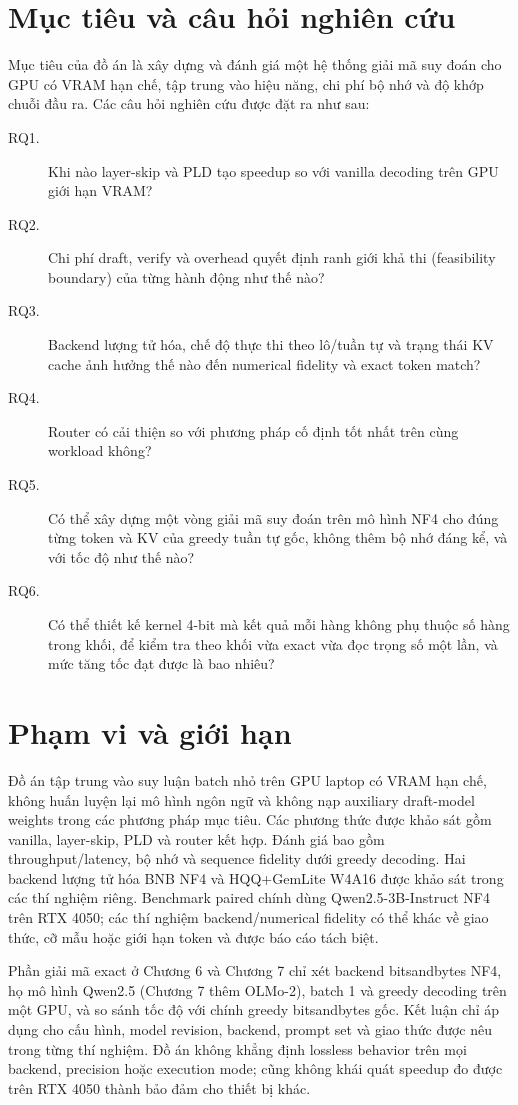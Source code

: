 \section{Mục tiêu và câu hỏi nghiên cứu}
Mục tiêu của đồ án là xây dựng và đánh giá một hệ thống giải mã suy đoán cho GPU có VRAM hạn chế, tập trung vào hiệu năng, chi phí bộ nhớ và độ khớp chuỗi đầu ra. Các câu hỏi nghiên cứu được đặt ra như sau:
\begin{description}
    \item[RQ1.] Khi nào layer-skip và PLD tạo speedup so với vanilla decoding trên GPU giới hạn VRAM?
    \item[RQ2.] Chi phí draft, verify và overhead quyết định ranh giới khả thi (feasibility boundary) của từng hành động như thế nào?
    \item[RQ3.] Backend lượng tử hóa, chế độ thực thi theo lô/tuần tự và trạng thái KV cache ảnh hưởng thế nào đến numerical fidelity và exact token match?
    \item[RQ4.] Router có cải thiện so với phương pháp cố định tốt nhất trên cùng workload không?
    \item[RQ5.] Có thể xây dựng một vòng giải mã suy đoán trên mô hình NF4 cho đúng từng token và KV của greedy tuần tự gốc, không thêm bộ nhớ đáng kể, và với tốc độ như thế nào?
    \item[RQ6.] Có thể thiết kế kernel 4-bit mà kết quả mỗi hàng không phụ thuộc số hàng trong khối, để kiểm tra theo khối vừa exact vừa đọc trọng số một lần, và mức tăng tốc đạt được là bao nhiêu?
\end{description}

\section{Phạm vi và giới hạn}
Đồ án tập trung vào suy luận batch nhỏ trên GPU laptop có VRAM hạn chế, không huấn luyện lại mô hình ngôn ngữ và không nạp auxiliary draft-model weights trong các phương pháp mục tiêu. Các phương thức được khảo sát gồm vanilla, layer-skip, PLD và router kết hợp. Đánh giá bao gồm throughput/latency, bộ nhớ và sequence fidelity dưới greedy decoding. Hai backend lượng tử hóa BNB NF4 và HQQ+GemLite W4A16 được khảo sát trong các thí nghiệm riêng. Benchmark paired chính dùng Qwen2.5-3B-Instruct NF4 trên RTX 4050; các thí nghiệm backend/numerical fidelity có thể khác về giao thức, cỡ mẫu hoặc giới hạn token và được báo cáo tách biệt.

Phần giải mã exact ở Chương 6 và Chương 7 chỉ xét backend bitsandbytes NF4, họ mô hình Qwen2.5 (Chương 7 thêm OLMo-2), batch 1 và greedy decoding trên một GPU, và so sánh tốc độ với chính greedy bitsandbytes gốc. Kết luận chỉ áp dụng cho cấu hình, model revision, backend, prompt set và giao thức được nêu trong từng thí nghiệm. Đồ án không khẳng định lossless behavior trên mọi backend, precision hoặc execution mode; cũng không khái quát speedup đo được trên RTX 4050 thành bảo đảm cho thiết bị khác.

